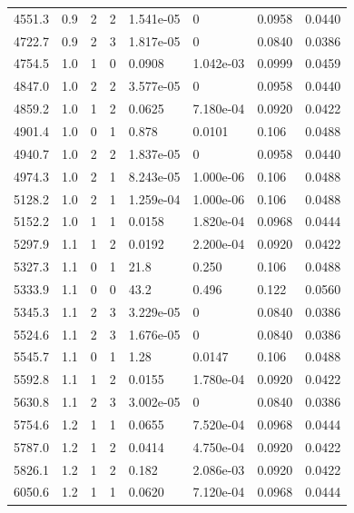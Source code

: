 \documentclass[preview]{standalone}
\begin{document}
{{{\begin{tabular}{L{1.2cm}C{1.2cm} C{0.3cm}C{0.5cm} C{1.4cm}C{1.4cm} C{1.4cm}C{1.4cm}}
  4551.3  &   0.9  & 2     &  2 &  1.541e-05  & 0  & 0.0958 &  0.0440   \\ 
  4722.7  &   0.9  & 2     &  3 &  1.817e-05  & 0  & 0.0840 &  0.0386   \\ 
  4754.5  &   1.0  & 1     &  0 &  0.0908  & 1.042e-03  & 0.0999 &  0.0459   \\ 
  4847.0  &   1.0  & 2     &  2 &  3.577e-05  & 0  & 0.0958 &  0.0440   \\ 
  4859.2  &   1.0  & 1     &  2 &  0.0625  & 7.180e-04  & 0.0920 &  0.0422   \\ 
  4901.4  &   1.0  & 0     &  1 &  0.878  & 0.0101  & 0.106 &  0.0488   \\ 
  4940.7  &   1.0  & 2     &  2 &  1.837e-05  & 0  & 0.0958 &  0.0440   \\ 
  4974.3  &   1.0  & 2     &  1 &  8.243e-05  & 1.000e-06  & 0.106 &  0.0488   \\ 
  5128.2  &   1.0  & 2     &  1 &  1.259e-04  & 1.000e-06  & 0.106 &  0.0488   \\ 
  5152.2  &   1.0  & 1     &  1 &  0.0158  & 1.820e-04  & 0.0968 &  0.0444   \\ 
  5297.9  &   1.1  & 1     &  2 &  0.0192  & 2.200e-04  & 0.0920 &  0.0422   \\ 
  5327.3  &   1.1  & 0     &  1 &  21.8  & 0.250  & 0.106 &  0.0488   \\ 
  5333.9  &   1.1  & 0     &  0 &  43.2  & 0.496  & 0.122 &  0.0560   \\ 
  5345.3  &   1.1  & 2     &  3 &  3.229e-05  & 0  & 0.0840 &  0.0386   \\ 
  5524.6  &   1.1  & 2     &  3 &  1.676e-05  & 0  & 0.0840 &  0.0386   \\ 
  5545.7  &   1.1  & 0     &  1 &  1.28  & 0.0147  & 0.106 &  0.0488   \\ 
  5592.8  &   1.1  & 1     &  2 &  0.0155  & 1.780e-04  & 0.0920 &  0.0422   \\ 
  5630.8  &   1.1  & 2     &  3 &  3.002e-05  & 0  & 0.0840 &  0.0386   \\ 
  5754.6  &   1.2  & 1     &  1 &  0.0655  & 7.520e-04  & 0.0968 &  0.0444   \\ 
  5787.0  &   1.2  & 1     &  2 &  0.0414  & 4.750e-04  & 0.0920 &  0.0422   \\ 
  5826.1  &   1.2  & 1     &  2 &  0.182  & 2.086e-03  & 0.0920 &  0.0422   \\ 
  6050.6  &   1.2  & 1     &  1 &  0.0620  & 7.120e-04  & 0.0968 &  0.0444   \\ 

\end{tabular}}}}
\end{document}
